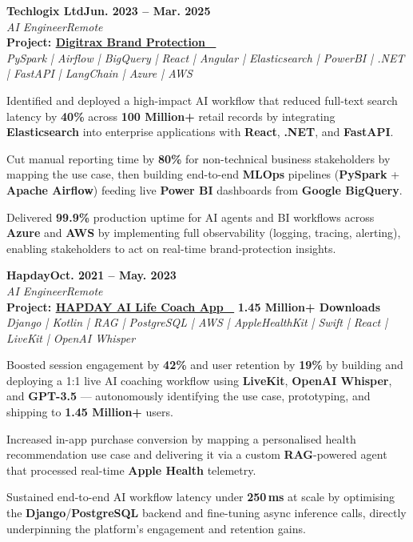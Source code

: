 \documentclass[letterpaper,10pt]{article}
\newcommand{\heading}[2]{
  \hspace{10pt}#1\hfill#2\\
}
\newcommand{\headingBf}[2]{
  \heading{\textbf{#1}}{\textbf{#2}}
}
\newcommand{\headingIt}[2]{
  \heading{\textit{#1}}{\textit{#2}}
}
\newenvironment{resume_list}{
  \vspace{-7pt}
  \begin{itemize}[itemsep=-2px, parsep=1pt, leftmargin=30pt]
}{
  \end{itemize}
}
\begin{document}
\headingBf{Techlogix Ltd}{Jun. 2023 -- Mar. 2025}
  \headingIt{AI Engineer}{Remote}
  \vspace{2pt}
  \textbf{Project: \href{https://authentix.com/solution-technologies/digital-authentication/}{\textcolor{accentText}{Digitrax Brand Protection ~\faExternalLink}}}\\
  \textit{PySpark | Airflow | BigQuery | React | Angular | Elasticsearch | PowerBI | .NET | FastAPI | LangChain | Azure | AWS}
  \begin{resume_list}
    \item Identified and deployed a high-impact AI workflow that reduced full-text search latency by \textbf{40\%} across \textbf{100 Million+} retail records by integrating \textbf{Elasticsearch} into enterprise applications with \textbf{React}, \textbf{.NET}, and \textbf{FastAPI}.
    \item Cut manual reporting time by \textbf{80\%} for non-technical business stakeholders by mapping the use case, then building end-to-end \textbf{MLOps} pipelines (\textbf{PySpark} + \textbf{Apache Airflow}) feeding live \textbf{Power BI} dashboards from \textbf{Google BigQuery}.
    \item Delivered \textbf{99.9\%} production uptime for AI agents and BI workflows across \textbf{Azure} and \textbf{AWS} by implementing full observability (logging, tracing, alerting), enabling stakeholders to act on real-time brand-protection insights.
    \vspace{1pt}
  \end{resume_list}

\headingBf{Hapday}{Oct. 2021 -- May. 2023}
  \headingIt{AI Engineer}{Remote}
  \vspace{2pt}
  \textbf{Project: \href{https://hapday.app/en/homepage/}{\textcolor{accentText}{HAPDAY AI Life Coach App ~\faExternalLink}}} \hfill \textbf{1.45 Million+ Downloads}\\
  \textit{Django | Kotlin | RAG | PostgreSQL | AWS | AppleHealthKit | Swift | React | LiveKit | OpenAI Whisper}
  \begin{resume_list}
    \item Boosted session engagement by \textbf{42\%} and user retention by \textbf{19\%} by building and deploying a 1:1 live AI coaching workflow using \textbf{LiveKit}, \textbf{OpenAI Whisper}, and \textbf{GPT-3.5} — autonomously identifying the use case, prototyping, and shipping to \textbf{1.45 Million+} users.
    \item Increased in-app purchase conversion by mapping a personalised health recommendation use case and delivering it via a custom \textbf{RAG}-powered agent that processed real-time \textbf{Apple Health} telemetry.
    \item Sustained end-to-end AI workflow latency under \textbf{250\,ms} at scale by optimising the \textbf{Django}/\textbf{PostgreSQL} backend and fine-tuning async inference calls, directly underpinning the platform's engagement and retention gains.
    \vspace{1pt}
  \end{resume_list}
\end{document}
